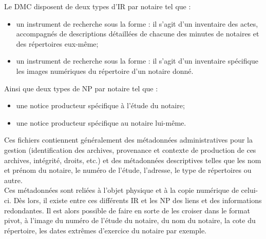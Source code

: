 Le DMC disposent de deux types d'IR par notaire tel que :
\begin{itemize}
    \item un instrument de recherche sous la forme  : il s'agit d'un inventaire des actes, accompagnés de descriptions détaillées de chacune des minutes de notaires et des répertoires eux-même;
    \item un instrument de recherche sous la forme  : il s'agit d'un inventaire spécifique les images numériques du répertoire d'un notaire donné.
\end{itemize}
Ainsi que deux types de NP par notaire tel que :
\begin{itemize}
    \item une notice producteur spécifique à l'étude du notaire;
    \item une notice producteur spécifique au notaire lui-même.
\end{itemize}
Ces fichiers contiennent généralement des métadonnées administratives pour la gestion (identification des archives, provenance et contexte de production de ces archives, intégrité, droits, etc.) et des métadonnées descriptives telles que les nom et prénom du notaire, le numéro de l'étude, l'adresse, le type de répertoires ou autre. \\

Ces  métadonnées sont reliées à l'objet physique et à la copie numérique de celui-ci. Dès lors, il existe entre ces différents IR et les NP des liens et des informations redondantes. Il est alors possible de faire en sorte de les croiser dans le format pivot, à l'image du numéro de l'étude du notaire, du nom du notaire, la cote du répertoire, les dates extrêmes d'exercice du notaire par exemple.\\

